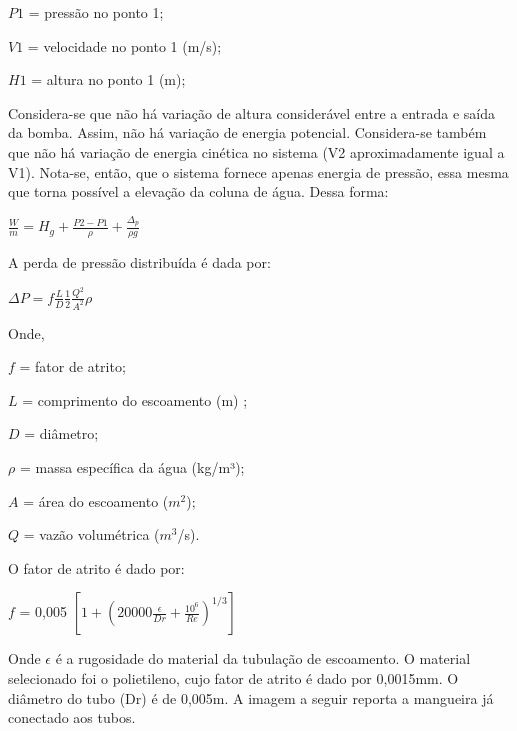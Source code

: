 $P1$ = pressão no ponto 1;

$V1$ = velocidade no ponto 1 (m/s);

$H1$ = altura no ponto 1 (m);

Considera-se que não há variação de altura considerável entre a entrada e saída da bomba. Assim, não há variação de energia potencial. Considera-se também que não há variação de energia cinética no sistema (V2 aproximadamente igual a V1). Nota-se, então, que o sistema fornece apenas energia de pressão, essa mesma que torna possível a elevação da coluna de água. Dessa forma:

\begin{center}
	\large
	${\displaystyle \frac{W}{m} = H_g + \frac{P2-P1}{\rho}+ \frac{\Delta_p}{\rho g}}$
\end{center}

A perda de pressão distribuída é dada por: 

\begin{center}
	\large
	${\displaystyle \Delta P = f \frac{L}{D} \frac{1}{2} \frac{Q^2}{A^2} \rho}$
\end{center}

Onde,

$f$ = fator de atrito;

$L$ = comprimento do escoamento (m) ;

$D$ = diâmetro;

$\rho$ = massa específica da água (kg/m³);

$A$ = área do escoamento ($m^2$);

$Q$ = vazão volumétrica ($m^3$/s).

O fator de atrito é dado por:
 
$f$ = 0,005 $\left [ 1 + (20000 \frac{\epsilon}{Dr} + \frac{10^6}{Re} )^{1/3} \right ]$

Onde $\epsilon$ é a rugosidade do material da tubulação de escoamento. O material selecionado foi o polietileno, cujo fator de atrito é dado por 0,0015mm. O diâmetro do tubo (Dr) é de 0,005m. A imagem a seguir reporta a mangueira já conectado aos tubos. 

